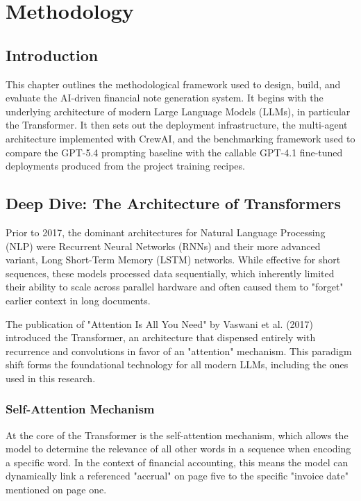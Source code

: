 \chapter{Methodology}
\label{chap:methodology}

\section{Introduction}
This chapter outlines the methodological framework used to design, build, and evaluate the AI-driven financial note generation system. It begins with the underlying architecture of modern Large Language Models (LLMs), in particular the Transformer. It then sets out the deployment infrastructure, the multi-agent architecture implemented with CrewAI, and the benchmarking framework used to compare the GPT-5.4 prompting baseline with the callable GPT-4.1 fine-tuned deployments produced from the project training recipes.

\section{Deep Dive: The Architecture of Transformers}
Prior to 2017, the dominant architectures for Natural Language Processing (NLP) were Recurrent Neural Networks (RNNs) and their more advanced variant, Long Short-Term Memory (LSTM) networks. While effective for short sequences, these models processed data sequentially, which inherently limited their ability to scale across parallel hardware and often caused them to "forget" earlier context in long documents. 

The publication of "Attention Is All You Need" by Vaswani et al. (2017) introduced the Transformer, an architecture that dispensed entirely with recurrence and convolutions in favor of an "attention" mechanism. This paradigm shift forms the foundational technology for all modern LLMs, including the ones used in this research.

\subsection{Self-Attention Mechanism}
At the core of the Transformer is the self-attention mechanism, which allows the model to determine the relevance of all other words in a sequence when encoding a specific word. In the context of financial accounting, this means the model can dynamically link a referenced "accrual" on page five to the specific "invoice date" mentioned on page one.

